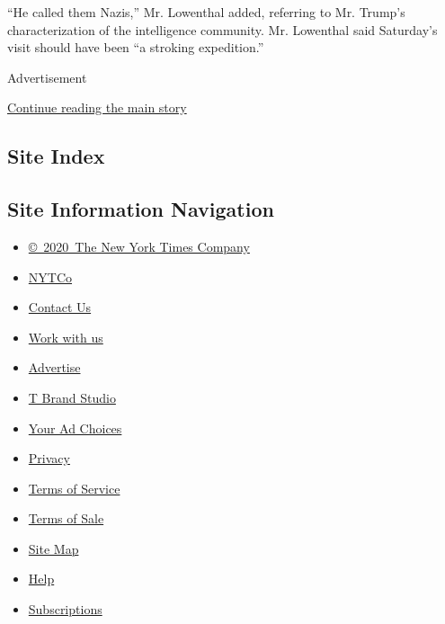 ``He called them Nazis,'' Mr. Lowenthal added, referring to Mr. Trump's
characterization of the intelligence community. Mr. Lowenthal said
Saturday's visit should have been ``a stroking expedition.''

Advertisement

\protect\hyperlink{after-bottom}{Continue reading the main story}

\hypertarget{site-index}{%
\subsection{Site Index}\label{site-index}}

\hypertarget{site-information-navigation}{%
\subsection{Site Information
Navigation}\label{site-information-navigation}}

\begin{itemize}
\tightlist
\item
  \href{https://help.nytimes.com/hc/en-us/articles/115014792127-Copyright-notice}{©~2020~The
  New York Times Company}
\end{itemize}

\begin{itemize}
\tightlist
\item
  \href{https://www.nytco.com/}{NYTCo}
\item
  \href{https://help.nytimes.com/hc/en-us/articles/115015385887-Contact-Us}{Contact
  Us}
\item
  \href{https://www.nytco.com/careers/}{Work with us}
\item
  \href{https://nytmediakit.com/}{Advertise}
\item
  \href{http://www.tbrandstudio.com/}{T Brand Studio}
\item
  \href{https://www.nytimes.com/privacy/cookie-policy\#how-do-i-manage-trackers}{Your
  Ad Choices}
\item
  \href{https://www.nytimes.com/privacy}{Privacy}
\item
  \href{https://help.nytimes.com/hc/en-us/articles/115014893428-Terms-of-service}{Terms
  of Service}
\item
  \href{https://help.nytimes.com/hc/en-us/articles/115014893968-Terms-of-sale}{Terms
  of Sale}
\item
  \href{https://spiderbites.nytimes.com}{Site Map}
\item
  \href{https://help.nytimes.com/hc/en-us}{Help}
\item
  \href{https://www.nytimes.com/subscription?campaignId=37WXW}{Subscriptions}
\end{itemize}
